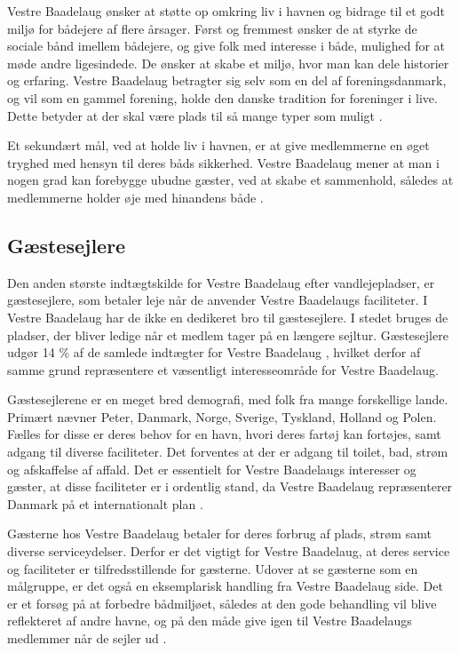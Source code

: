 Vestre Baadelaug ønsker at støtte op omkring liv i havnen og bidrage til et godt miljø for bådejere af flere årsager. Først og fremmest ønsker de at styrke de sociale bånd imellem bådejere, og give folk med interesse i både, mulighed for at møde andre ligesindede. De ønsker at skabe et miljø, hvor man kan dele historier og erfaring. Vestre Baadelaug betragter sig selv som en del af foreningsdanmark, og vil som en gammel forening, holde den danske tradition for foreninger i live. Dette betyder at der skal være plads til så mange typer som muligt \cite{int_vb_sl}.


Et sekundært mål, ved at holde liv i havnen, er at give medlemmerne en øget tryghed med hensyn til deres båds sikkerhed. Vestre Baadelaug mener at man i nogen grad kan forebygge ubudne gæster, ved at skabe et sammenhold, således at medlemmerne holder øje med hinandens både \cite{int_vb_sl}.


\subsection{Gæstesejlere}\label{sec:gaste}

Den anden største indtægtskilde for Vestre Baadelaug efter vandlejepladser, er gæstesejlere, som betaler leje når de anvender Vestre Baadelaugs faciliteter. I Vestre Baadelaug har de ikke en dedikeret bro til gæstesejlere. I stedet bruges de pladser, der bliver ledige når et medlem tager på en længere sejltur. Gæstesejlere udgør 14 \% af de samlede indtægter for Vestre Baadelaug \cite{vestre_arsregnskab}, hvilket derfor af samme grund repræsentere et væsentligt interesseområde for Vestre Baadelaug.

Gæstesejlerene er en meget bred demografi, med folk fra mange forskellige lande. Primært nævner Peter, Danmark, Norge, Sverige, Tyskland, Holland og Polen. Fælles for disse er deres behov for en havn, hvori deres fartøj kan fortøjes, samt adgang til diverse faciliteter. Det forventes at der er adgang til toilet, bad, strøm og afskaffelse af affald. Det er essentielt for Vestre Baadelaugs interesser og gæster, at disse faciliteter er i ordentlig stand, da Vestre Baadelaug repræsenterer Danmark på et internationalt plan \cite{int_vb_sl}.

Gæsterne hos Vestre Baadelaug betaler for deres forbrug af plads, strøm samt diverse serviceydelser. Derfor er det vigtigt for Vestre Baadelaug, at deres service og faciliteter er tilfredsstillende for gæsterne. Udover at se gæsterne som en målgruppe, er det også en eksemplarisk handling fra Vestre Baadelaug side. Det er et forsøg på at forbedre bådmiljøet, således at den gode behandling vil blive reflekteret af andre havne, og på den måde give igen til Vestre Baadelaugs medlemmer når de sejler ud \cite{int_vb_sl}.


